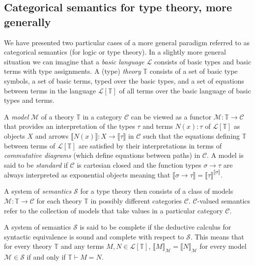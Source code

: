 \subsection*{Categorical semantics for type theory, more generally}
We have presented two particular cases of a more general paradigm referred to as categorical semantics (for logic or type theory). In a slightly more general situation we can imagine that a \emph{basic language} $\mathcal{L}$ consists of basic types and basic terms with type assignments. A (type) \emph{theory} $\mathbb{T}$ consists of a set of basic type symbols, a set of basic terms, typed over the basic types, and a set of equations between terms in the language $\mathcal{L}[\mathbb{T}]$ of all terms over the basic language of basic types and terms. 

A \emph{model} $\mathcal{M}$ of a theory $\mathbb{T}$ in a category $\mathcal{C}$ can be viewed as a functor $\mathcal{M} \colon \mathbb{T} \rightarrow \mathcal{C}$ that provides an interpretation of the types $\tau$ and terms $N(x) \colon \tau$ of $\mathcal{L}[\mathbb{T}]$ as objects $X$ and arrows $\llbracket N(x) \rrbracket \colon X \rightarrow \llbracket \tau \rrbracket$ in $\mathcal{C}$ such that the equations defining $\mathbb{T}$ between terms of $\mathcal{L}[\mathbb{T}]$ are satisfied by their interpretations in terms of \emph{commutative diagrams} (which define equations between paths) in $\mathcal{C}$. A model is said to be \emph{standard} if $\mathcal{C}$ is cartesian closed and the function types $\sigma \rightarrow \tau$ are always interpreted as exponential objects meaning that $\llbracket \sigma \rightarrow \tau \rrbracket = \llbracket \tau \rrbracket ^ {\llbracket \sigma \rrbracket}$.

A system of \emph{semantics} $\mathcal{S}$ for a type theory then consists of a class of models $\mathcal{M} \colon \mathbb{T} \rightarrow \mathcal{C}$ for each theory $\mathbb{T}$ in possibly different categories $\mathcal{C}$. $\mathcal{C}$-valued semantics refer to the collection of models that take values in a particular category $\mathcal{C}$.

A system of semantics $\mathcal{S}$ is said to be complete if the deductive calculus for syntactic equivalence is sound and complete with respect to $\mathcal{S}$. This means that for every theory $\mathbb{T}$ and any terms $M, N \in \mathcal{L}[\mathbb{T}]$, $\llbracket M \rrbracket_{\mathcal{M}} = \llbracket N \rrbracket_{\mathcal{M}}$ for every model $\mathcal{M} \in \mathcal{S}$ if and only if $\mathbb{T} \vdash M = N$.

